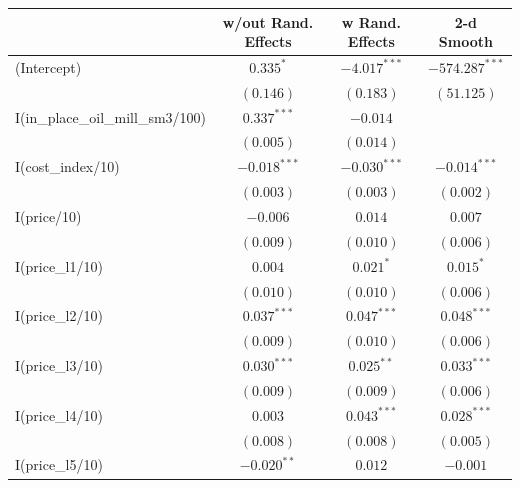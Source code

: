\documentclass[11pt]{article}
\begin{document}
\begin{table}
\begin{center}
\begin{tabular}{l c c c }
\hline
                                             & w/out Rand. Effects & w Rand. Effects & 2-d Smooth \\
\hline
(Intercept)                                  & $0.335^{*}$    & $-4.017^{***}$ & $-574.287^{***}$ \\
                                             & $(0.146)$      & $(0.183)$      & $(51.125)$       \\
I(in\_place\_oil\_mill\_sm3/100)             & $0.337^{***}$  & $-0.014$       &                  \\
                                             & $(0.005)$      & $(0.014)$      &                  \\
I(cost\_index/10)                            & $-0.018^{***}$ & $-0.030^{***}$ & $-0.014^{***}$   \\
                                             & $(0.003)$      & $(0.003)$      & $(0.002)$        \\
I(price/10)                                  & $-0.006$       & $0.014$        & $0.007$          \\
                                             & $(0.009)$      & $(0.010)$      & $(0.006)$        \\
I(price\_l1/10)                              & $0.004$        & $0.021^{*}$    & $0.015^{*}$      \\
                                             & $(0.010)$      & $(0.010)$      & $(0.006)$        \\
I(price\_l2/10)                              & $0.037^{***}$  & $0.047^{***}$  & $0.048^{***}$    \\
                                             & $(0.009)$      & $(0.010)$      & $(0.006)$        \\
I(price\_l3/10)                              & $0.030^{***}$  & $0.025^{**}$   & $0.033^{***}$    \\
                                             & $(0.009)$      & $(0.009)$      & $(0.006)$        \\
I(price\_l4/10)                              & $0.003$        & $0.043^{***}$  & $0.028^{***}$    \\
                                             & $(0.008)$      & $(0.008)$      & $(0.005)$        \\
I(price\_l5/10)                              & $-0.020^{**}$  & $0.012$        & $-0.001$         \\

\end{tabular}
\end{center}
\end{table}
\end{document}
